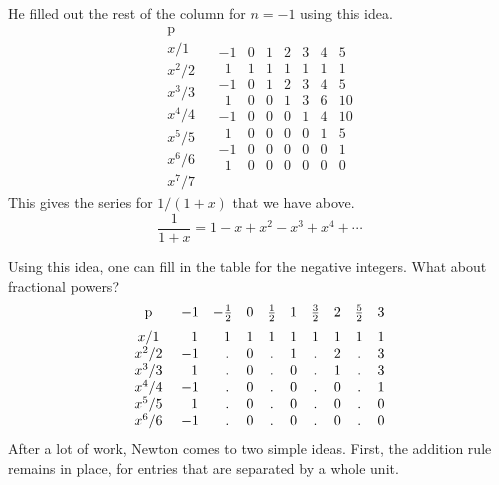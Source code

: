\documentclass[11pt, oneside]{article}
\begin{document}
He filled out the rest of the column for $n=-1$ using this idea.  
\[
\begin{matrix}
\text{p}  \\
x/1  \\
x^2/2 \\
x^3/3 \\
x^4/4 \\
x^5/5 \\
x^6/6 \\
x^7/7
\end{matrix} \ \ \ \
\begin{matrix}
-1 & 0 & 1 & 2 & 3 & 4 & 5  \\
\ \ 1 & 1 & 1 & 1 & 1 & 1 & 1  \\
-1 & 0 & 1 & 2 & 3 & 4 & 5 \\
\ \ 1 & 0 & 0 & 1 & 3 & 6 & 10 \\
-1 & 0 & 0 & 0 & 1 & 4 & 10 \\
\ \ 1 & 0 & 0 & 0 & 0 & 1 & 5 \\
-1 & 0 & 0 & 0 & 0 & 0 & 1 \\
\ \ 1 & 0 & 0 & 0 & 0 & 0 & 0
\end{matrix}
\]
This gives the series for $1/(1+x)$ that we have above.  
\[ \frac{1}{1+x} = 1 - x + x^2 - x^3 + x^4 + \cdots  \]

Using this idea, one can fill in the table for the negative integers.  What about fractional powers?
\[
\begin{matrix}
\text{p}  \vspace{2 mm} \\
x/1  \\
x^2/2 \\
x^3/3 \\
x^4/4 \\
x^5/5 \\
x^6/6
\end{matrix} \ \ \ \
\begin{matrix}
-1 & -\frac{1}{2} & 0& \frac{1}{2} & 1& \frac{3}{2}  & 2 & \frac{5}{2}  & 3   \vspace{2 mm}  \\
\ \ 1 & \ \ 1 & 1 & 1 & 1 & 1 & 1 & 1 & 1 \\
-1 & \ \ . & 0 & . & 1 & . & 2 & . & 3 \\
\ \ 1 & \ \ . & 0 & . & 0 & . & 1 & . & 3 \\
-1 &  \ \ .  & 0 & . & 0 & . & 0 & . & 1 \\
\ \ 1 &  \ \ . & 0 & . & 0 & . & 0 & . & 0 \\
-1 &   \ \  . & 0 & . & 0 & . & 0 & . & 0 \\
\end{matrix}
\]
After a lot of work, Newton comes to two simple ideas.  First, the addition rule remains in place, for entries that are separated by a whole unit.
\end{document}
